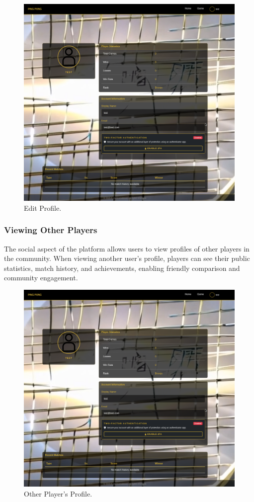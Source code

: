 \begin{figure}[H]
    \centering
    \includegraphics[width=0.65\linewidth]{Figures/images/new_images/ProfilePage.png} %
    \caption{Edit Profile.} %
    \label{fig:edit-profile-journey}
\end{figure}

\subsubsection{Viewing Other Players} The social aspect of the platform allows users to view profiles of other players in the community. When viewing another user's profile, players can see their public statistics, match history, and achievements, enabling friendly comparison and community engagement.

\begin{figure}[H]
    \centering
    \includegraphics[width=0.65\linewidth]{Figures/images/new_images/ProfilePage.png} %
    \caption{Other Player's Profile.} %
    \label{fig:other-profile-journey}
\end{figure}


